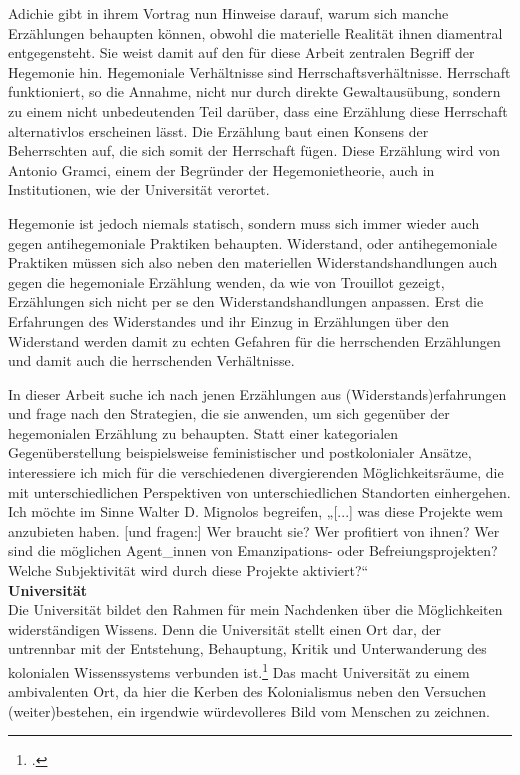 Adichie gibt in ihrem Vortrag nun Hinweise darauf, warum sich manche
Erzählungen behaupten können, obwohl die materielle Realität ihnen diamentral
entgegensteht. Sie weist damit auf den für diese Arbeit zentralen Begriff der
Hegemonie hin. Hegemoniale Verhältnisse sind
Herrschaftsverhältnisse.\footnotemark{} Herrschaft
funktioniert, so die Annahme, nicht nur durch direkte Gewaltausübung, sondern
zu einem nicht unbedeutenden Teil darüber, dass eine Erzählung diese Herrschaft
alternativlos erscheinen lässt. Die Erzählung baut einen Konsens der
Beherrschten auf, die sich somit der Herrschaft fügen. Diese Erzählung wird von
Antonio Gramci, einem der Begründer der Hegemonietheorie, auch in
Institutionen, wie der Universität verortet.

Hegemonie ist jedoch niemals statisch, sondern muss sich immer wieder auch
gegen antihegemoniale Praktiken behaupten. Widerstand, oder antihegemoniale
Praktiken müssen sich also neben den materiellen Widerstandshandlungen auch
gegen die hegemoniale Erzählung wenden, da wie von Trouillot gezeigt,
Erzählungen sich nicht per se den Widerstandshandlungen anpassen. Erst die
Erfahrungen des Widerstandes und ihr Einzug in Erzählungen über den Widerstand
werden damit zu echten Gefahren für die herrschenden Erzählungen und damit auch
die herrschenden Verhältnisse.

In dieser Arbeit suche ich nach jenen Erzählungen aus (Widerstands)erfahrungen
und frage nach den Strategien, die sie anwenden, um sich gegenüber der
hegemonialen Erzählung zu behaupten. Statt einer kategorialen Gegenüberstellung
beispielsweise feministischer und postkolonialer Ansätze, interessiere ich mich
für die verschiedenen divergierenden Möglichkeitsräume, die mit
unterschiedlichen Perspektiven von unterschiedlichen Standorten einhergehen.
Ich möchte im Sinne Walter D. Mignolos begreifen, „[...] was diese Projekte wem
anzubieten haben. [und fragen:] Wer braucht sie? Wer profitiert von ihnen? Wer
sind die möglichen Agent\_innen von Emanzipations- oder Befreiungsprojekten?
Welche Subjektivität wird durch diese Projekte
aktiviert?“\footnotemark{}\\

\textbf{\large Universität}\\
Die Universität bildet den Rahmen für mein Nachdenken über die Möglichkeiten
widerständigen Wissens. Denn die Universität stellt einen Ort dar, der
untrennbar mit der Entstehung, Behauptung, Kritik und Unterwanderung des
kolonialen Wissenssystems verbunden ist.\footnotemark\footcitetext{grosfugel}
Das macht Universität zu einem ambivalenten Ort, da hier die Kerben des
Kolonialismus neben den Versuchen (weiter)bestehen, ein irgendwie würdevolleres
Bild vom Menschen zu zeichnen.

